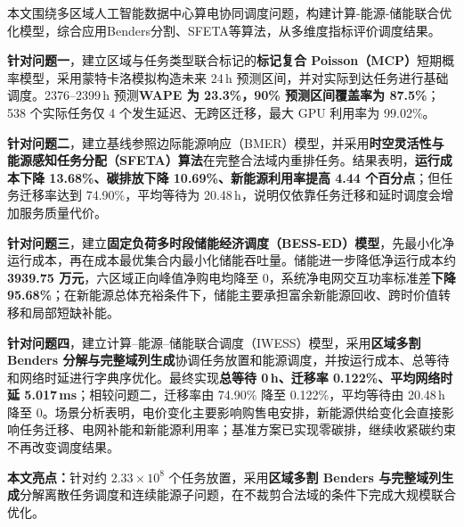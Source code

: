 本文围绕多区域人工智能数据中心算电协同调度问题，构建计算-能源-储能联合优化模型，综合应用Benders分割、SFETA等算法，从多维度指标评价调度结果。

\textbf{针对问题一}，建立区域与任务类型联合标记的\textbf{标记复合 Poisson（MCP）}短期概率模型，采用蒙特卡洛模拟构造未来 24\,h 预测区间，并对实际到达任务进行基础调度。2376--2399\,h 预测\textbf{WAPE 为 23.3\%，90\% 预测区间覆盖率为 87.5\%}；538 个实际任务仅 4 个发生延迟、无跨区迁移，最大 GPU 利用率为 99.02\%。

\textbf{针对问题二}，建立基线参照边际能源响应（BMER）模型，并采用\textbf{时空灵活性与能源感知任务分配（SFETA）算法}在完整合法域内重排任务。结果表明，\textbf{运行成本下降 13.68\%、碳排放下降 10.69\%、新能源利用率提高 4.44 个百分点}；但任务迁移率达到 74.90\%，平均等待为 20.48\,h，说明仅依靠任务迁移和延时调度会增加服务质量代价。

\textbf{针对问题三}，建立\textbf{固定负荷多时段储能经济调度（BESS-ED）模型}，先最小化净运行成本，再在成本最优集合内最小化储能吞吐量。储能进一步降低净运行成本约\textbf{3939.75 万元}，六区域正向峰值净购电均降至 0，系统净电网交互功率标准差\textbf{下降 95.68\%}；在新能源总体充裕条件下，储能主要承担富余新能源回收、跨时价值转移和局部短缺补能。

\textbf{针对问题四}，建立计算--能源--储能联合调度（IWESS）模型，采用\textbf{区域多割 Benders 分解与完整域列生成}协调任务放置和能源调度，并按运行成本、总等待和网络时延进行字典序优化。最终实现\textbf{总等待 0\,h、迁移率 0.122\%、平均网络时延 5.017\,ms}；相较问题二，迁移率由 74.90\% 降至 0.122\%，平均等待由 20.48\,h 降至 0。场景分析表明，电价变化主要影响购售电安排，新能源供给变化会直接影响任务迁移、电网补能和新能源利用率；基准方案已实现零碳排，继续收紧碳约束不再改变调度结果。

\textbf{本文亮点：}针对约 $2.33\times10^8$ 个任务放置，采用\textbf{区域多割 Benders 与完整域列生成}分解离散任务调度和连续能源子问题，在不裁剪合法域的条件下完成大规模联合优化。

